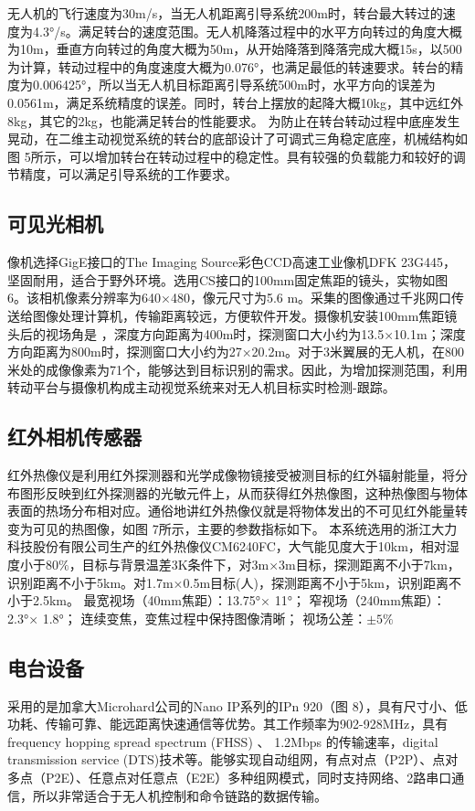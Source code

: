 无人机的飞行速度为30m/s，当无人机距离引导系统200m时，转台最大转过的速度为4.3°/s。满足转台的速度范围。无人机降落过程中的水平方向转过的角度大概为10m，垂直方向转过的角度大概为50m，从开始降落到降落完成大概15s，以500为计算，转动过程中的角度速度大概为0.076°，也满足最低的转速要求。转台的精度为0.006425°，所以当无人机目标距离引导系统500m时，水平方向的误差为0.0561m，满足系统精度的误差。同时，转台上摆放的起降大概10kg，其中远红外8kg，其它的2kg，也能满足转台的性能要求。
为防止在转台转动过程中底座发生晃动，在二维主动视觉系统的转台的底部设计了可调式三角稳定底座，机械结构如图 5所示，可以增加转台在转动过程中的稳定性。具有较强的负载能力和较好的调节精度，可以满足引导系统的工作要求。

\subsection{可见光相机}
像机选择GigE接口的The Imaging Source彩色CCD高速工业像机DFK 23G445，坚固耐用，适合于野外环境。选用CS接口的100mm固定焦距的镜头，实物如图 6。该相机像素分辨率为640×480，像元尺寸为5.6 m。采集的图像通过千兆网口传送给图像处理计算机，传输距离较远，方便软件开发。摄像机安装100mm焦距镜头后的视场角是 ，深度方向距离为400m时，探测窗口大小约为13.5×10.1m；深度方向距离为800m时，探测窗口大小约为27×20.2m。对于3米翼展的无人机，在800米处的成像像素为71个，能够达到目标识别的需求。因此，为增加探测范围，利用转动平台与摄像机构成主动视觉系统来对无人机目标实时检测-跟踪。

\subsection{红外相机传感器}
红外热像仪是利用红外探测器和光学成像物镜接受被测目标的红外辐射能量，将分布图形反映到红外探测器的光敏元件上，从而获得红外热像图，这种热像图与物体表面的热场分布相对应。通俗地讲红外热像仪就是将物体发出的不可见红外能量转变为可见的热图像，如图 7所示，主要的参数指标如下。
本系统选用的浙江大力科技股份有限公司生产的红外热像仪CM6240FC，大气能见度大于10km，相对湿度小于$80\%$，目标与背景温差3K条件下，对3m×3m目标，探测距离不小于7km，识别距离不小于5km。对1.7m×0.5m目标(人)，探测距离不小于5km，识别距离不小于2.5km。
 	最宽视场（40mm焦距）：13.75°× 11°；
 	窄视场（240mm焦距）：2.3°× 1.8°；
 	连续变焦，变焦过程中保持图像清晰；
 	视场公差：$±5\%$
 	
\subsection{电台设备}	
采用的是加拿大Microhard公司的Nano IP系列的IPn 920（图 8），具有尺寸小、低功耗、传输可靠、能远距离快速通信等优势。其工作频率为902-928MHz，具有 frequency hopping spread spectrum (FHSS) 、 1.2Mbps 的传输速率，digital transmission service (DTS)技术等。能够实现自动组网，有点对点（P2P）、点对多点（P2E）、任意点对任意点（E2E）多种组网模式，同时支持网络、2路串口通信，所以非常适合于无人机控制和命令链路的数据传输。



